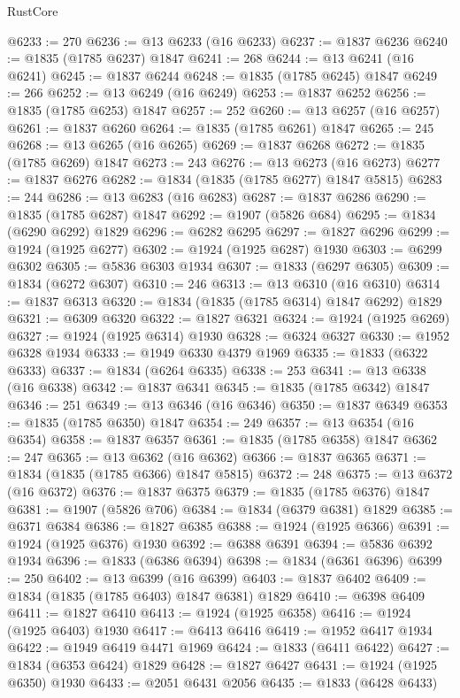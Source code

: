\begin{lexlean}{RustCore}
\begin{coremodule}
@6233 := 270
@6236 := @13 @6233 (@16 @6233)
@6237 := @1837 @6236
@6240 := @1835 (@1785 @6237) @1847
@6241 := 268
@6244 := @13 @6241 (@16 @6241)
@6245 := @1837 @6244
@6248 := @1835 (@1785 @6245) @1847
@6249 := 266
@6252 := @13 @6249 (@16 @6249)
@6253 := @1837 @6252
@6256 := @1835 (@1785 @6253) @1847
@6257 := 252
@6260 := @13 @6257 (@16 @6257)
@6261 := @1837 @6260
@6264 := @1835 (@1785 @6261) @1847
@6265 := 245
@6268 := @13 @6265 (@16 @6265)
@6269 := @1837 @6268
@6272 := @1835 (@1785 @6269) @1847
@6273 := 243
@6276 := @13 @6273 (@16 @6273)
@6277 := @1837 @6276
@6282 := @1834 (@1835 (@1785 @6277) @1847 @5815)
@6283 := 244
@6286 := @13 @6283 (@16 @6283)
@6287 := @1837 @6286
@6290 := @1835 (@1785 @6287) @1847
@6292 := @1907 (@5826 @684)
@6295 := @1834 (@6290 @6292) @1829
@6296 := @6282 @6295
@6297 := @1827 @6296
@6299 := @1924 (@1925 @6277)
@6302 := @1924 (@1925 @6287) @1930
@6303 := @6299 @6302
@6305 := @5836 @6303 @1934
@6307 := @1833 (@6297 @6305)
@6309 := @1834 (@6272 @6307)
@6310 := 246
@6313 := @13 @6310 (@16 @6310)
@6314 := @1837 @6313
@6320 := @1834 (@1835 (@1785 @6314) @1847 @6292) @1829
@6321 := @6309 @6320
@6322 := @1827 @6321
@6324 := @1924 (@1925 @6269)
@6327 := @1924 (@1925 @6314) @1930
@6328 := @6324 @6327
@6330 := @1952 @6328 @1934
@6333 := @1949 @6330 @4379 @1969
@6335 := @1833 (@6322 @6333)
@6337 := @1834 (@6264 @6335)
@6338 := 253
@6341 := @13 @6338 (@16 @6338)
@6342 := @1837 @6341
@6345 := @1835 (@1785 @6342) @1847
@6346 := 251
@6349 := @13 @6346 (@16 @6346)
@6350 := @1837 @6349
@6353 := @1835 (@1785 @6350) @1847
@6354 := 249
@6357 := @13 @6354 (@16 @6354)
@6358 := @1837 @6357
@6361 := @1835 (@1785 @6358) @1847
@6362 := 247
@6365 := @13 @6362 (@16 @6362)
@6366 := @1837 @6365
@6371 := @1834 (@1835 (@1785 @6366) @1847 @5815)
@6372 := 248
@6375 := @13 @6372 (@16 @6372)
@6376 := @1837 @6375
@6379 := @1835 (@1785 @6376) @1847
@6381 := @1907 (@5826 @706)
@6384 := @1834 (@6379 @6381) @1829
@6385 := @6371 @6384
@6386 := @1827 @6385
@6388 := @1924 (@1925 @6366)
@6391 := @1924 (@1925 @6376) @1930
@6392 := @6388 @6391
@6394 := @5836 @6392 @1934
@6396 := @1833 (@6386 @6394)
@6398 := @1834 (@6361 @6396)
@6399 := 250
@6402 := @13 @6399 (@16 @6399)
@6403 := @1837 @6402
@6409 := @1834 (@1835 (@1785 @6403) @1847 @6381) @1829
@6410 := @6398 @6409
@6411 := @1827 @6410
@6413 := @1924 (@1925 @6358)
@6416 := @1924 (@1925 @6403) @1930
@6417 := @6413 @6416
@6419 := @1952 @6417 @1934
@6422 := @1949 @6419 @4471 @1969
@6424 := @1833 (@6411 @6422)
@6427 := @1834 (@6353 @6424) @1829
@6428 := @1827 @6427
@6431 := @1924 (@1925 @6350) @1930
@6433 := @2051 @6431 @2056
@6435 := @1833 (@6428 @6433)

\end{coremodule}
\end{lexlean}
